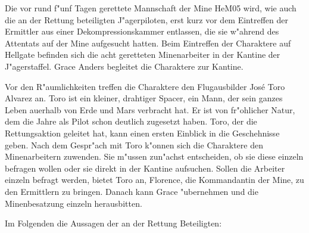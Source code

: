 
Die vor rund f"unf Tagen gerettete Mannschaft der Mine HeM05 wird, wie auch die an der Rettung beteiligten J"agerpiloten, erst kurz vor dem Eintreffen der Ermittler aus einer Dekompressionskammer entlassen, die sie w"ahrend des Attentats auf der Mine aufgesucht hatten. Beim Eintreffen der Charaktere auf Hellgate befinden sich die acht geretteten Minenarbeiter in der Kantine der J"agerstaffel. Grace Anders begleitet die Charaktere zur Kantine.

Vor den R"aumlichkeiten treffen die Charaktere den Flugausbilder Jos\'{e} \frqq{}Toro\flqq{} Alvarez an. Toro ist ein kleiner, drahtiger Spacer, ein Mann, der sein ganzes Leben au\3erhalb von Erde und Mars verbracht hat. Er ist von fr"ohlicher Natur, dem die Jahre als Pilot schon deutlich zugesetzt haben. Toro, der die Rettungsaktion geleitet hat, kann einen ersten Einblick in die Geschehnisse geben. Nach dem Gespr"ach mit Toro k"onnen sich die Charaktere den Minenarbeitern zuwenden. Sie m"ussen zun"achst entscheiden, ob sie diese einzeln befragen wollen oder sie direkt in der Kantine aufsuchen. Sollen die Arbeiter einzeln befragt werden, bietet Toro an, Florence, die Kommandantin der Mine, zu den Ermittlern zu bringen. Danach kann Grace "ubernehmen und die Minenbesatzung einzeln herausbitten.

Im Folgenden die Aussagen der an der Rettung Beteiligten:

